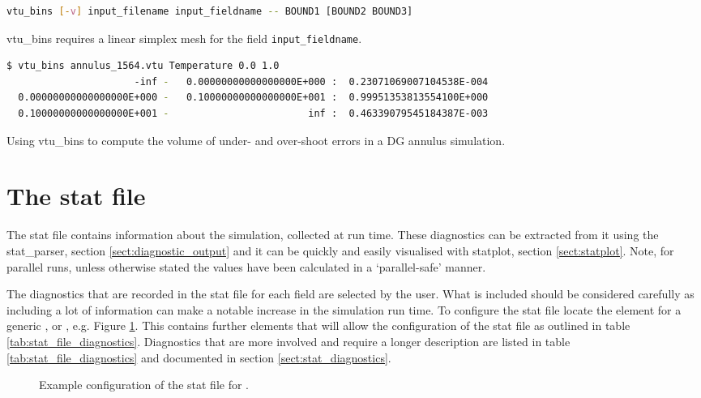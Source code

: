 \begin{lstlisting}[language = Bash]
vtu_bins [-v] input_filename input_fieldname -- BOUND1 [BOUND2 BOUND3]
\end{lstlisting}

vtu\_bins requires a linear simplex mesh for the field
\lstinline[language = Bash]+input_fieldname+.

\begin{example}
  \begin{lstlisting}[language = Bash]
$ vtu_bins annulus_1564.vtu Temperature 0.0 1.0
                      -inf -   0.00000000000000000E+000 :  0.23071069007104538E-004
  0.00000000000000000E+000 -   0.10000000000000000E+001 :  0.99951353813554100E+000
  0.10000000000000000E+001 -                        inf :  0.46339079545184387E-003
  \end{lstlisting}
\caption{Using vtu\_bins to compute the volume of under- and over-shoot errors in
         a DG annulus simulation.}
\end{example}


\section{The stat file}
\label{sect:diagnostics_stat_file}

The stat file contains information about the simulation, collected at run time. These diagnostics can be extracted from it using the stat\_parser, section \ref{sect:diagnostic_output} and it can be quickly and easily visualised with statplot, section \ref{sect:statplot}. Note, for parallel runs, unless otherwise stated the values have been calculated in a `parallel-safe' manner.

The diagnostics that are recorded in the stat file for each field are selected by the user.  What is included should be considered carefully as including a lot of information can make a notable increase in the simulation run time. To configure the stat file locate the  element for a generic ,  or , e.g. Figure \ref{fig:diamond_enable_stat}. This contains further elements that will allow the configuration of the stat file as outlined in table \ref{tab:stat_file_diagnostics}. Diagnostics that are more involved and require a longer description are listed in table \ref{tab:stat_file_diagnostics} and documented in section \ref{sect:stat_diagnostics}.

\begin{figure}[ht]
  \centering
  \caption{Example configuration of the stat file for .}
  \label{fig:diamond_enable_stat}
\end{figure}

